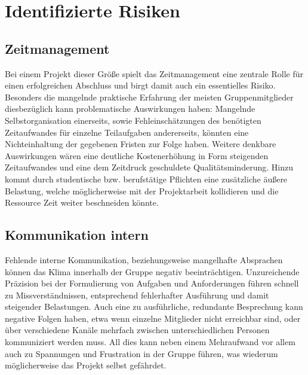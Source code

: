 \pagebreak


\section{Identifizierte Risiken}

\subsection{Zeitmanagement}\label{r1} 
  Bei einem Projekt dieser Größe spielt das Zeitmanagement eine zentrale Rolle für einen erfolgreichen Abschluss und birgt damit auch ein essentielles Risiko. 
  Besonders die mangelnde praktische Erfahrung der meisten Gruppenmitglieder diesbezüglich kann problematische Auswirkungen haben: Mangelnde Selbstorganisation einerseits, sowie\hack{\break} Fehleinschätzungen des benötigten Zeitaufwandes für einzelne Teilaufgaben andererseits, könnten eine Nichteinhaltung der gegebenen Fristen zur Folge haben. 
  Weitere denkbare Auswirkungen wären eine deutliche Kostenerhöhung in Form steigenden Zeitaufwandes und eine dem Zeitdruck geschuldete Qualitätsminderung. 
  Hinzu kommt durch studentische bzw. berufstätige Pflichten eine zusätzliche äußere Belastung, welche möglicherweise mit der Projektarbeit kollidieren und die Ressource Zeit weiter beschneiden könnte.
  

\subsection{Kommunikation intern}\label{r2}
  Fehlende interne Kommunikation, beziehungsweise mangelhafte Absprachen können das Klima innerhalb der Gruppe negativ beeinträchtigen. Unzureichende Präzision bei der Formulierung von Aufgaben und Anforderungen führen schnell zu Missverständnissen, entsprechend fehlerhafter Ausführung und damit steigender Belastungen. Auch eine zu ausführliche, redundante Besprechung kann negative Folgen haben, etwa wenn einzelne Mitglieder nicht erreichbar sind, oder über verschiedene Kanäle mehrfach zwischen unterschiedlichen Personen kommuniziert werden muss. All dies kann neben einem Mehr\-auf\-wand vor allem auch zu Spannungen und Frustration in der Gruppe führen, was wiederum möglicherweise das Projekt selbst gefährdet.
  


